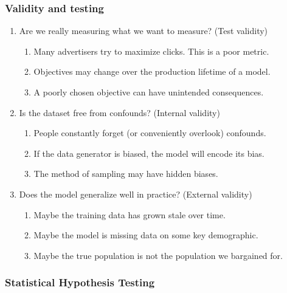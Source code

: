 \documentclass{beamer}
\begin{document}
\begin{frame}
\frametitle{Validity and testing}
\begin{enumerate}
\item Are we really measuring what we want to measure? (Test validity)
\begin{enumerate}
\item Many advertisers try to maximize clicks. This is a poor metric.
\item Objectives may change over the production lifetime of a model.
\item A poorly chosen objective can have unintended consequences.
\end{enumerate}
\item Is the dataset free from confounds? (Internal validity)
\begin{enumerate}
\item People constantly forget (or conveniently overlook) confounds.
\item If the data generator is biased, the model will encode its bias.
\item The method of sampling may have hidden biases.
\end{enumerate}
\item Does the model generalize well in practice? (External validity)
\begin{enumerate}
\item Maybe the training data has grown stale over time.
\item Maybe the model is missing data on some key demographic.
\item Maybe the true population is not the population we bargained for.
\end{enumerate}
\end{enumerate}
\end{frame}

\begin{frame}
\frametitle{Statistical Hypothesis Testing}
\vspace{-1cm}
\center{}
\end{frame}
\end{document}
